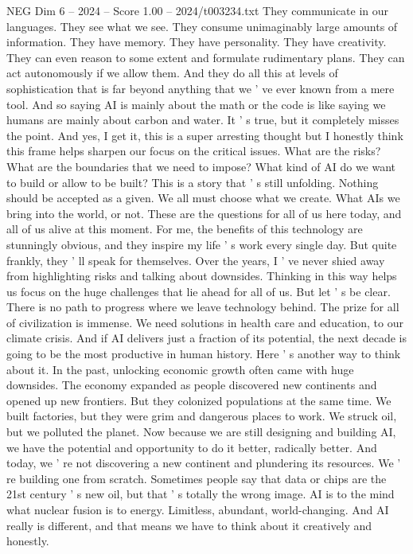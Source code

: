 \begin{textsample}{NEG Dim 6 – 2024 – Score 1.00 – 2024/t003234.txt}
They communicate in our languages.
They see what we see.
They consume unimaginably large amounts of information.
They have memory.
They have personality.
They have creativity.
They can even reason to some extent and formulate rudimentary plans.
They can act autonomously if we allow them.
And they do all this at levels of sophistication that is far beyond anything that we ' ve ever known from a mere tool.
And so saying AI is mainly about the math or the code is like saying we humans are mainly about carbon and water.
It ' s true, but it completely misses the point.
And yes, I get it, this is a super arresting thought but I honestly think this frame helps sharpen our focus on the critical issues.
What are the risks?
What are the boundaries that we need to impose?
What kind of AI do we want to build or allow to be built?
This is a story that ' s still unfolding.
Nothing should be accepted as a given.
We all must choose what we create.
What AIs we bring into the world, or not.
These are the questions for all of us here today, and all of us alive at this moment.
For me, the benefits of this technology are stunningly obvious, and they inspire my life ' s work every single day.
But quite frankly, they ' ll speak for themselves.
Over the years, I ' ve never shied away from highlighting risks and talking about downsides.
Thinking in this way helps us focus on the huge challenges that lie ahead for all of us.
But let ' s be clear.
There is no path to progress where we leave technology behind.
The prize for all of civilization is immense.
We need solutions in health care and education, to our climate crisis.
And if AI delivers just a fraction of its potential, the next decade is going to be the most productive in human history.
Here ' s another way to think about it.
In the past, unlocking economic growth often came with huge downsides.
The economy expanded as people discovered new continents and opened up new frontiers.
But they colonized populations at the same time.
We built factories, but they were grim and dangerous places to work.
We struck oil, but we polluted the planet.
Now because we are still designing and building AI, we have the potential and opportunity to do it better, radically better.
And today, we ' re not discovering a new continent and plundering its resources.
We ' re building one from scratch.
Sometimes people say that data or chips are the 21st century ' s new oil, but that ' s totally the wrong image.
AI is to the mind what nuclear fusion is to energy.
Limitless, abundant, world-changing.
And AI really is different, and that means we have to think about it creatively and honestly.

\end{textsample}
